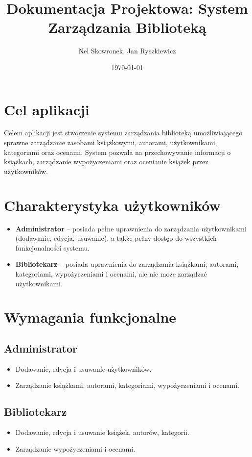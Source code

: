 \documentclass{article}
\title{Dokumentacja Projektowa: System Zarządzania Biblioteką}
\author{Nel Skowronek, Jan Ryszkiewicz}
\date{\today}
\begin{document}
\maketitle

\section{Cel aplikacji}
Celem aplikacji jest stworzenie systemu zarządzania biblioteką umożliwiającego sprawne zarządzanie zasobami książkowymi, autorami, użytkownikami, kategoriami oraz ocenami. System pozwala na przechowywanie informacji o książkach, zarządzanie wypożyczeniami oraz ocenianie książek przez użytkowników.

\section*{Charakterystyka użytkowników}
\begin{itemize}
    \item \textbf{Administrator} – posiada pełne uprawnienia do zarządzania użytkownikami (dodawanie, edycja, usuwanie), a także pełny dostęp do wszystkich funkcjonalności systemu.
    \item \textbf{Bibliotekarz} – posiada uprawnienia do zarządzania książkami, autorami, kategoriami, wypożyczeniami i ocenami, ale nie może zarządzać użytkownikami.
\end{itemize}

\section*{Wymagania funkcjonalne}
\subsection*{Administrator}
\begin{itemize}
    \item Dodawanie, edycja i usuwanie użytkowników.
    \item Zarządzanie książkami, autorami, kategoriami, wypożyczeniami i ocenami.
\end{itemize}

\subsection*{Bibliotekarz}
\begin{itemize}
    \item Dodawanie, edycja i usuwanie książek, autorów, kategorii.
    \item Zarządzanie wypożyczeniami i ocenami.
\end{itemize}
\end{document}
